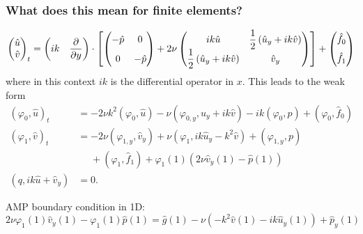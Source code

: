 \documentclass[8pt]{beamer}
\begin{document}
\begin{frame}
    \frametitle{What does this mean for finite elements?}
    \begin{align}
        \begin{pmatrix}
            \hat{u} \\ \hat{v}
        \end{pmatrix}_t
        =
        \begin{pmatrix}
            i k & \dfrac{\partial}{\partial y}
        \end{pmatrix}
        \cdot
        \left[
        \begin{pmatrix}
            -\hat{p} \vphantom{\dfrac{1}{2}} & 0                              \\
            0 \vphantom{\dfrac{1}{2}}        & -\hat{p}
        \end{pmatrix}
        +
        2 \nu
        \begin{pmatrix}
            i k \hat{u} & \dfrac{1}{2} \left(\hat{u}_y + i k \hat{v}\right)   \\
            \dfrac{1}{2} \left(\hat{u}_y + i k \hat{v}\right) & \hat{v}_y
        \end{pmatrix}
        \right]
        +
        \begin{pmatrix}
            \hat{f}_0 \vphantom{\dfrac{1}{2}}                                 \\
            \hat{f}_1 \vphantom{\dfrac{1}{2}}
        \end{pmatrix}
    \end{align}
    where in this context \(i k\) is the differential operator in \(x\). This
    leads to the weak form
    \begin{align}
        (\varphi_0, \hat{u})_t
        &=
        -2 \nu k^2 (\varphi_0, \hat{u})
        - \nu (\varphi_{0,y}, \hat{u}_y + i k \hat{v})
        - i k (\varphi_0, p)
        + (\varphi_0, \hat{f}_0)                                              \\
        (\varphi_1, \hat{v})_t
        &=
        -2 \nu (\varphi_{1,y}, \hat{v}_y)
        + \nu (\varphi_1, i k \hat{u}_y - k^2 \hat{v})
        + (\varphi_{1,y}, p)                                                  \\
        &\phantom{=} + (\varphi_1, \hat{f}_1)
        + \varphi_1(1) (2 \nu \hat{v}_y(1) - \hat{p}(1))
        \nonumber                                                             \\
        (q, i k \hat{u} + \hat{v}_y)
        &= 0.
    \end{align}

    \pause
    AMP boundary condition in 1D:
    \begin{equation}
        2 \nu \varphi_1(1) \hat{v}_y(1) - \varphi_1(1) \hat{p}(1)
        = \hat{g}(1) - \nu (-k^2 \hat{v}(1) - i k \hat{u}_y(1)) + \hat{p}_y(1)
    \end{equation}
\end{frame}
\end{document}

